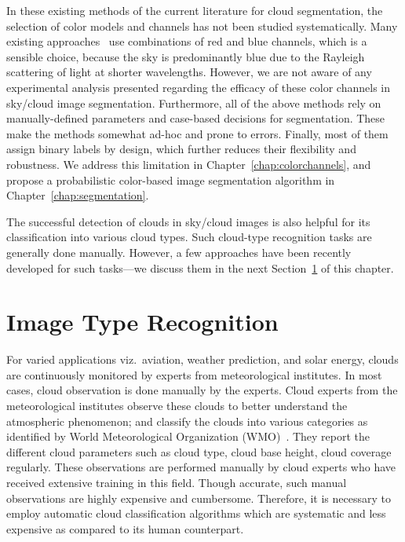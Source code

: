 In these existing methods of the current literature for cloud segmentation, the selection of color models and channels has not been studied systematically. Many existing approaches~\cite{Calbo2008,Heinle2010,LiuSP2015,Li2011,LiuGC2015} use combinations of red and blue channels, which is a sensible choice, because the sky is predominantly blue due to the Rayleigh scattering of light at shorter wavelengths. However, we are not aware of any experimental analysis presented regarding the efficacy of these color channels in sky/cloud image segmentation. Furthermore, all of the above methods rely on manually-defined parameters and case-based decisions for segmentation. These make the methods somewhat ad-hoc and prone to errors. Finally, most of them assign binary labels by design, which further reduces their flexibility and robustness. We address this limitation in Chapter~\ref{chap:colorchannels}, and propose a probabilistic color-based image segmentation algorithm in Chapter~\ref{chap:segmentation}.

The successful detection of clouds in sky/cloud images is also helpful for its classification into various cloud types. Such cloud-type recognition tasks are generally done manually. However, a few approaches have been recently developed for such tasks---we discuss them in the next Section~\ref{sec:lit-classify} of this chapter.


\section{Image Type Recognition}
\label{sec:lit-classify}

For varied applications viz.\ aviation, weather prediction, and solar energy, clouds are continuously monitored by experts from meteorological institutes. In most cases, cloud observation is done manually by the experts. Cloud experts from the meteorological institutes observe these clouds to better understand the atmospheric phenomenon; and classify the clouds into various categories as identified by World Meteorological Organization (WMO)~\cite{WMO_guide}. They report the different cloud parameters such as cloud type, cloud base height, cloud coverage regularly. These observations are performed manually by cloud experts who have received extensive training in this field. Though accurate, such manual observations are highly expensive and cumbersome. Therefore, it is necessary to employ automatic cloud classification algorithms which are systematic and less expensive as compared to its human counterpart. 

